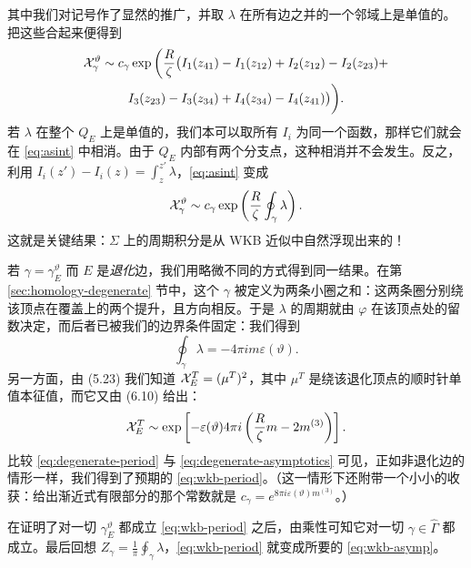 其中我们对记号作了显然的推广，并取 $\lambda$ 在所有边之并的一个邻域上是单值的。把这些合起来便得到
\begin{multline} \label{eq:asint}
\mathcal{X}^\vartheta_\gamma \sim c_\gamma
\exp \bigg( \frac{R}{\zeta} \big(I_1(z_{41})-I_1(z_{12})+I_2(z_{12})-I_2(z_{23})+ \\  I_3(z_{23})-I_3(z_{34})+I_4(z_{34})-I_4(z_{41}) \big) \bigg).
\end{multline}
若 $\lambda$ 在整个 $Q_E$ 上是单值的，我们本可以取所有 $I_i$ 为同一个函数，那样它们就会在 \eqref{eq:asint} 中相消。由于 $Q_E$ 内部有两个分支点，这种相消并不会发生。反之，利用 $I_i(z')-I_i(z)=\int^{z'}_z\lambda$，\eqref{eq:asint} 变成
\begin{equation} \label{eq:wkb-period}
\mathcal{X}^\vartheta_\gamma \sim c_\gamma \exp \left(\frac{R}{\zeta} \oint_\gamma \lambda \right).
\end{equation}
这就是关键结果：$\Sigma$ 上的周期积分是从 WKB 近似中自然浮现出来的！

若 $\gamma=\gamma^\vartheta_E$ 而 $E$ 是\emph{退化}边，我们用略微不同的方式得到同一结果。在第 \ref{sec:homology-degenerate} 节中，这个 $\gamma$ 被定义为两条小圈之和：这两条圈分别绕该顶点在覆盖上的两个提升，且方向相反。于是 $\lambda$ 的周期就由 $\varphi$ 在该顶点处的留数决定，而后者已被我们的边界条件固定：我们得到
\begin{equation} \label{eq:degenerate-period}
\oint_{\gamma} \lambda = -4 \pi i m \varepsilon(\vartheta).
\end{equation}
另一方面，由 (5.23)%
我们知道 $\mathcal{X}^T_E=(\mu^T)^{2}$，其中 $\mu^T$ 是绕该退化顶点的顺时针单值本征值，而它又由 (6.10)%
给出：
\begin{equation} \label{eq:degenerate-asymptotics}
\mathcal{X}^T_E \sim \exp \left[- \varepsilon(\vartheta) 4 \pi i \left( \frac{R}{\zeta} m - 2 m^{(3)} \right) \right].
\end{equation}
比较 \eqref{eq:degenerate-period} 与 \eqref{eq:degenerate-asymptotics} 可见，正如非退化边的情形一样，我们得到了预期的 \eqref{eq:wkb-period}。（这一情形下还附带一个小小的收获：给出渐近式有限部分的那个常数就是 $c_\gamma=e^{8\pi i\varepsilon(\vartheta)m^{(3)}}$。）

在证明了对一切 $\gamma^\vartheta_E$ 都成立 \eqref{eq:wkb-period} 之后，由乘性可知它对一切 $\gamma\in\hat\Gamma$ 都成立。最后回想 $Z_\gamma=\frac{1}{\pi}\oint_\gamma\lambda$，\eqref{eq:wkb-period} 就变成所要的 \eqref{eq:wkb-asymp}。

